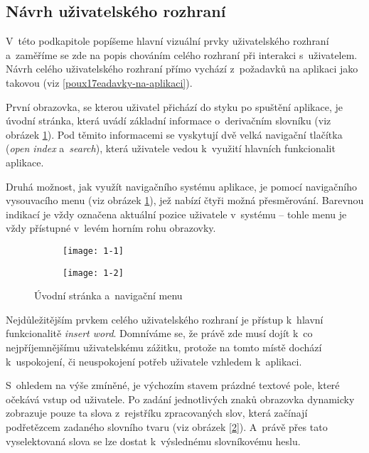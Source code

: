 \hypertarget{nuxe1vrh-uux17eivatelskuxe9ho-rozhranuxed}{%
\subsection{Návrh uživatelského
rozhraní}\label{nuxe1vrh-uux17eivatelskuxe9ho-rozhranuxed}}

V~této podkapitole popíšeme hlavní vizuální prvky uživatelského rozhraní
a~zaměříme se zde na popis chováním celého rozhraní při interakci
s~uživatelem. Návrh celého uživatelského rozhraní přímo vychází
z~požadavků na aplikaci jako takovou (viz
\ref{poux17eadavky-na-aplikaci}).

První obrazovka, se kterou uživatel přichází do styku po spuštění
aplikace, je úvodní stránka, která uvádí základní informace o~derivačním
slovníku (viz obrázek \ref{1}). Pod těmito informacemi se vyskytují dvě
velká navigační tlačítka (\emph{open index} a~\emph{search}), která
uživatele vedou k~využití hlavních funkcionalit aplikace.

Druhá možnost, jak využít navigačního systému aplikace, je pomocí
navigačního vysouvacího menu (viz obrázek \ref{1}), jež nabízí čtyři
možná přesměrování. Barevnou indikací je vždy označena aktuální pozice
uživatele v~systému -- tohle menu je vždy přístupné v~levém horním rohu
obrazovky.

\begin{figure}[hb!]
  \begin{subfigure}[b]{0.45\textwidth}
    \texttt{[image: 1-1]}
  \end{subfigure}
  \hfill
  \begin{subfigure}[b]{0.45\textwidth}
    \texttt{[image: 1-2]}
  \end{subfigure}
  \caption{Úvodní stránka a~navigační menu}
  \label{1}
\end{figure}

Nejdůležitějším prvkem celého uživatelského rozhraní je přístup k~hlavní
funkcionalitě \emph{insert word}. Domníváme se, že právě zde musí dojít
k~co nejpříjemnějšímu uživatelskému zážitku, protože na tomto místě
dochází k~uspokojení, či neuspokojení potřeb uživatele vzhledem
k~aplikaci.

S~ohledem na výše zmíněné, je výchozím stavem prázdné textové pole,
které očekává vstup od uživatele. Po zadání jednotlivých znaků obrazovka
dynamicky zobrazuje pouze ta slova z~rejstříku zpracovaných slov, která
začínají podřetězcem zadaného slovního tvaru (viz obrázek \ref{2}).
A~právě přes tato vyselektovaná slova se lze dostat k~výslednému
slovníkovému heslu.

